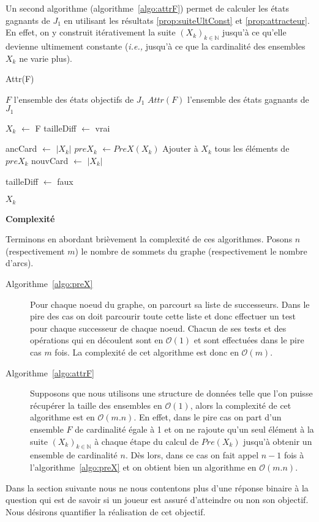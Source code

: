 Un second algorithme (algorithme~\ref{algo:attrF}) permet de calculer les états gagnants de $J_{1}$ en utilisant les résultats \ref{prop:suiteUltConst} et \ref{prop:attracteur}. En effet, on y construit itérativement la suite $(X_{k})_{k \in \mathbb{N}}$ jusqu'à ce qu'elle devienne ultimement constante (\emph{i.e.,} jusqu'à ce que la cardinalité des ensembles $X_{k}$ ne varie plus).

\begin{algorithm}
	\caption{Attr(F)}
	\label{algo:attrF}
	\begin{algorithmic}[1]
		\REQUIRE $F$ l'ensemble des états objectifs de $J_{1}$
		\ENSURE $Attr(F)$ l'ensemble des états gagnants de $J_{1}$
		
		\STATE $X_{k}$ $\leftarrow$ F
		\STATE tailleDiff $\leftarrow$ vrai
		
			\STATE ancCard $\leftarrow$ $|X_{k}|$
			\STATE $preX_{k}$ $\leftarrow PreX(X_{k})$
			\STATE Ajouter à $X_{k}$ tous les éléments de $preX_{k}$
			\STATE nouvCard $\leftarrow$ $|X_{k}|$
			
				\STATE tailleDiff $\leftarrow$ faux
			\ENDIF
		\ENDWHILE
		
		\RETURN $X_{k}$
\end{algorithmic}
\end{algorithm}
$ $\\

\noindent\textbf{Complexité}

Terminons en abordant brièvement la complexité de ces algorithmes. Posons $n$ (respectivement $m$) le nombre de sommets du graphe (respectivement le nombre d'arcs).
\begin{description}
	\item[Algorithme~\ref{algo:preX}] Pour chaque noeud du graphe, on parcourt sa liste de successeurs. Dans le pire des cas on doit parcourir toute cette liste et donc effectuer un test pour chaque successeur de chaque noeud. Chacun de ses tests et des opérations qui en découlent sont en $\mathcal{O}(1)$ et sont effectuées dans le pire cas $m$ fois. La complexité de cet algorithme est donc en $\mathcal{O}(m)$.
	
	\item[Algorithme~\ref{algo:attrF}] Supposons que nous utilisons une structure de données telle que l'on puisse récupérer la taille des ensembles en $\mathcal{O}(1)$, alors la complexité de cet algorithme est en $\mathcal{O}(m.n)$. En effet, dans le pire cas on part d'un ensemble $F$ de cardinalité égale à 1 et on ne rajoute qu'un seul élément à la suite $(X_k)_{k \in \mathbb{N}}$ à chaque étape du calcul de $Pre(X_k)$ jusqu'à obtenir un ensemble de cardinalité $n$. Dès lors, dans ce cas on fait appel $n-1$ fois à l'algorithme~\ref{algo:preX} et on obtient bien un algorithme en $\mathcal{O}(m.n)$.

	
\end{description}

Dans la section suivante nous ne nous contentons plus d'une réponse binaire à la question qui est de savoir si un joueur est assuré d'atteindre ou non son objectif. Nous désirons quantifier la réalisation de cet objectif. 

\FloatBarrier


